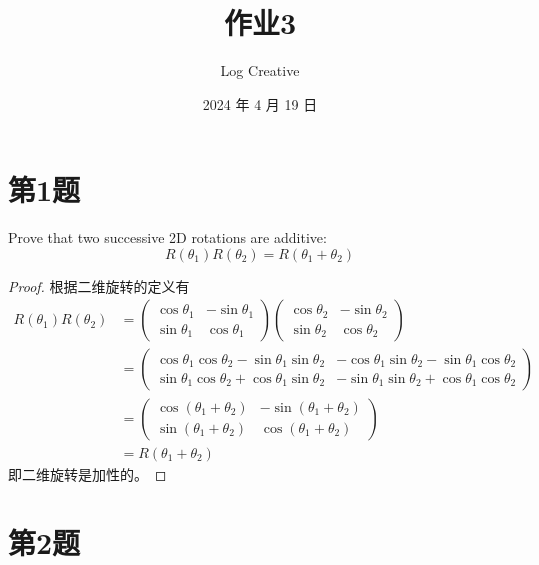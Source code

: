 \documentclass[math-font=newcm]{sjtuarticle}
\title{作业3}
\author{Log Creative}
\date{2024 年 4 月 19 日}
\begin{document}
\maketitle

\tableofcontents*

\section{第1题}

Prove that two successive 2D rotations are additive:
\begin{equation}
    R(\theta_1) R(\theta_2) = R(\theta_1 + \theta_2) 
\end{equation}

\begin{proof}
    根据二维旋转的定义有
    \begin{align*}
        R(\theta_1)R(\theta_2)&=\begin{pmatrix}
            \cos\theta_1 & -\sin\theta_1 \\
            \sin\theta_1 & \cos\theta_1
        \end{pmatrix}\begin{pmatrix}
            \cos\theta_2 & -\sin\theta_2 \\
            \sin\theta_2 & \cos\theta_2
        \end{pmatrix} \\
        &=\begin{pmatrix}
            \cos\theta_1\cos\theta_2-\sin\theta_1\sin\theta_2 &
            -\cos\theta_1\sin\theta_2-\sin\theta_1\cos\theta_2 \\
            \sin\theta_1\cos\theta_2+\cos\theta_1\sin\theta_2 &
            -\sin\theta_1\sin\theta_2+\cos\theta_1\cos\theta_2
        \end{pmatrix} \\
        &=\begin{pmatrix}
            \cos(\theta_1+\theta_2) & -\sin(\theta_1+\theta_2) \\
            \sin(\theta_1+\theta_2) & \cos(\theta_1+\theta_2)
        \end{pmatrix}\\
        &=R(\theta_1+\theta_2)
    \end{align*}
    即二维旋转是加性的。
\end{proof}

\section{第2题}
\end{document}
